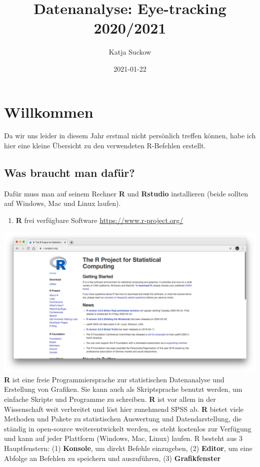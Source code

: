 \documentclass[]{book}
\title{Datenanalyse: Eye-tracking 2020/2021}
\author{Katja Suckow}
\date{2021-01-22}
\providecommand{\tightlist}{%
  \setlength{\itemsep}{0pt}\setlength{\parskip}{0pt}}
\begin{document}
\maketitle

{
\setcounter{tocdepth}{1}
\tableofcontents
}
\chapter{Willkommen}\label{willkommen}

Da wir uns leider in diesem Jahr erstmal nicht persönlich treffen
können, habe ich hier eine kleine Übersicht zu den verwendeten
R-Befehlen erstellt.

\section{Was braucht man dafür?}\label{was-braucht-man-dafuxfcr}

Dafür muss man auf seinem Rechner \textbf{R} und \textbf{Rstudio}
installieren (beide sollten auf Windows, Mac und Linux laufen).

\begin{enumerate}
\def\labelenumi{\arabic{enumi}.}
\tightlist
\item
  \textbf{R} frei verfügbare Software \url{https://www.r-project.org/}
\end{enumerate}

\includegraphics{./img/Rdownload.png} \textbf{R} ist eine freie
Programmiersprache zur statistischen Datenanalyse und Erstellung von
Grafiken. Sie kann auch als Skriptsprache benutzt werden, um einfache
Skripte und Programme zu schreiben. \textbf{R} ist vor allem in der
Wissenschaft weit verbreitet und löst hier zunehmend SPSS ab. \textbf{R}
bietet viele Methoden und Pakete zu statistischen Auswertung und
Datendarstellung, die ständig in open-source weiterentwickelt werden, es
steht kostenlos zur Verfügung und kann auf jeder Plattform (Windows,
Mac, Linux) laufen. R besteht aus 3 Hauptfenstern: (1) \textbf{Konsole},
um direkt Befehle einzugeben, (2) \textbf{Editor}, um eine Abfolge an
Befehlen zu speichern und auszuführen, (3) \textbf{Grafikfenster}
\end{document}
